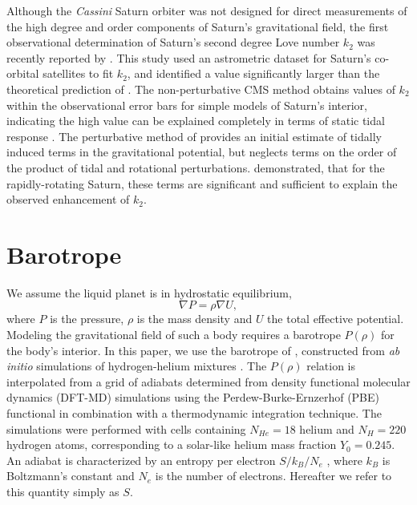 Although the \textit{Cassini} Saturn orbiter was not designed for direct measurements
of the high degree and order components of Saturn's gravitational field, the first observational
determination of Saturn's second degree Love number $k_2$ was recently reported by
\citet{lainey2016}. This study used an astrometric dataset for Saturn's co-orbital
satellites to fit $k_2$, and identified a value significantly larger than the
theoretical prediction of \citet{gavrilov1977}. The non-perturbative CMS method
obtains values of $k_2$ within the observational error bars for simple models of
Saturn's interior, indicating the high value can be explained completely in terms of
static tidal response \citep{wahl2016}. The perturbative method of
\citet{gavrilov1977} provides an initial estimate of tidally induced terms in the
gravitational potential, but neglects terms on the order of the product of tidal
and rotational perturbations. \citet{wahl2016} demonstrated, that for the
rapidly-rotating Saturn, these terms are significant and sufficient to explain the
observed enhancement of $k_2$.

\section{Barotrope}

We assume the liquid planet is in hydrostatic equilibrium,
%
\begin{equation} \nabla P = \rho \nabla U,     
    \label{eq:hydrostatic} \end{equation}
%
where $P$ is the pressure, $\rho$ is the mass density and $U$ the total effective
potential. Modeling the gravitational field of such a body requires a barotrope
$P(\rho)$ for the body's interior. In this paper, we use the barotrope of
\citet{hubbard2016}, constructed from \textit{ab initio} simulations of
hydrogen-helium mixtures \citep{militzer2013a,militzer2013b}. The $P(\rho)$ relation
is interpolated from a grid of adiabats determined from density functional 
molecular dynamics (DFT-MD) simulations using the Perdew-Burke-Ernzerhof (PBE) functional
\citep{PBE} in combination with a thermodynamic integration technique. The
simulations were performed with cells containing $N_{He}=18$ helium and $N_{H}=220$
hydrogen atoms, corresponding to a solar-like helium mass fraction $Y_0=0.245$. An
adiabat is characterized by an entropy per electron $S/k_B/N_e$
\citep{militzer2013b}, where $k_B$ is Boltzmann's constant and $N_e$ is the number of
electrons. Hereafter we refer to this quantity simply as $S$.

